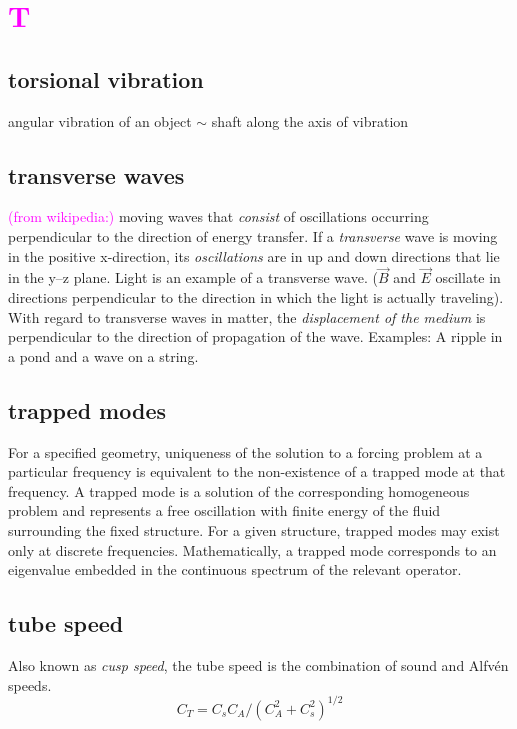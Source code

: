 \documentclass[12pt]{article}
\begin{document}
\section*{\textcolor{magenta}{T}}

\subsection*{torsional vibration}
\begin{itemize*}
    \item angular vibration of an object $\sim$ shaft along the
        axis of vibration
\end{itemize*}

\subsection*{transverse waves}
\textcolor{magenta}{(from wikipedia:)}
moving waves that \emph{consist} of oscillations occurring perpendicular
to the direction of energy transfer.
If a \emph{transverse} wave is moving in the positive x-direction,
its \emph{oscillations} are in up and down directions that lie in the y–z plane.
Light is an example of a transverse wave.
($\vec B$ and $\vec E$ oscillate in directions perpendicular to the direction
in which the light is actually traveling).
With regard to transverse waves in matter,
the \emph{displacement of the medium} is perpendicular to the
direction of propagation of the wave.
Examples: A ripple in a pond and a wave on a string.

\subsection*{trapped modes}
For a specified geometry, uniqueness of the solution to a forcing problem
at a particular frequency is equivalent to the non-existence of a trapped
mode at that frequency. A trapped mode is a solution of the corresponding
homogeneous problem and represents a free oscillation with finite energy
of the fluid surrounding the fixed structure. For a given structure,
trapped modes may exist only at discrete frequencies.
Mathematically, a trapped mode corresponds to an eigenvalue embedded
in the continuous spectrum of the relevant operator.

\subsection*{tube speed}
Also known as \emph{cusp speed}, the tube speed is the combination of sound
and Alfv\'en speeds.
$$ C_T = C_sC_A/(C_A^2 + C_s^2)^{1/2} $$
\end{document}
